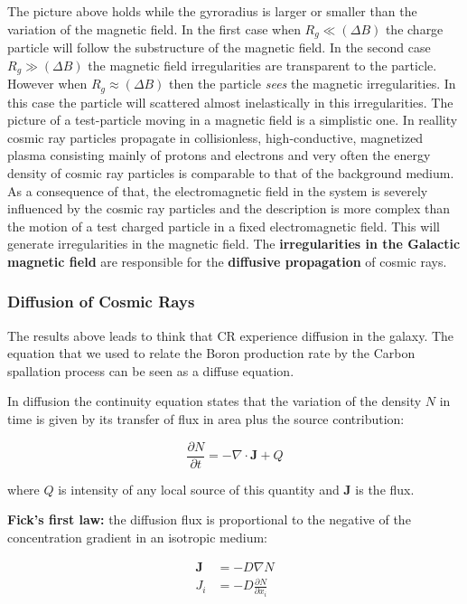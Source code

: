 \documentclass[
  letterpaper,
  DIV=11,
  numbers=noendperiod]{scrreprt}
\begin{document}
The picture above holds while the gyroradius is larger or smaller than
the variation of the magnetic field. In the first case when
\(R_g \ll (\Delta B)\) the charge particle will follow the substructure
of the magnetic field. In the second case \(R_g \gg (\Delta B)\) the
magnetic field irregularities are transparent to the particle. However
when \(R_g \approx (\Delta B)\) then the particle \emph{sees} the
magnetic irregularities. In this case the particle will scattered almost
inelastically in this irregularities. The picture of a test-particle
moving in a magnetic field is a simplistic one. In reallity cosmic ray
particles propagate in collisionless, high-conductive, magnetized plasma
consisting mainly of protons and electrons and very often the energy
density of cosmic ray particles is comparable to that of the background
medium. As a consequence of that, the electromagnetic field in the
system is severely influenced by the cosmic ray particles and the
description is more complex than the motion of a test charged particle
in a fixed electromagnetic field. This will generate irregularities in
the magnetic field. The \textbf{irregularities in the Galactic magnetic
field} are responsible for the \textbf{diffusive propagation} of cosmic
rays.

\subsubsection*{Diffusion of Cosmic
Rays}\label{diffusion-of-cosmic-rays}

The results above leads to think that CR experience diffusion in the
galaxy. The equation that we used to relate the Boron production rate by
the Carbon spallation process can be seen as a diffuse equation.

In diffusion the continuity equation states that the variation of the
density \(N\) in time is given by its transfer of flux in area plus the
source contribution:

\[\frac{\partial N}{\partial t}= - \nabla \cdot \mathbf{J} + Q \]

where \(Q\) is intensity of any local source of this quantity and
\(\mathbf{J}\) is the flux.

\textbf{Fick's first law:} the diffusion flux is proportional to the
negative of the concentration gradient in an isotropic medium:

\[\begin{aligned}
\mathbf{J}&=-D \nabla N \\
J_i&=-D \frac{\partial N}{\partial x_i}
\end{aligned}\]
\end{document}
